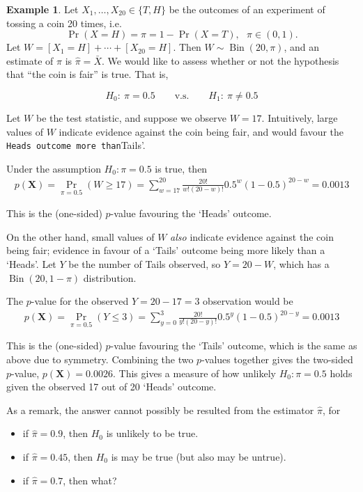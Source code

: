 \documentclass[
]{book}
\providecommand{\tightlist}{%
  \setlength{\itemsep}{0pt}\setlength{\parskip}{0pt}}
\newcommand{\bX}{{\boldsymbol X}}
\DeclareMathOperator{\Bin}{Bin}
\theoremstyle{definition}
\theoremstyle{definition}
\newtheorem{example}{Example}[chapter]
\theoremstyle{definition}
\theoremstyle{definition}
\theoremstyle{remark}
\begin{document}
\begin{example}
\protect\hypertarget{exm:binom}{}\label{exm:binom}Let \(X_1,\dots,X_{20} \in \{T,H\}\) be the outcomes of an experiment of tossing a coin 20 times, i.e.
\[\Pr(X = H) = \pi = 1 - \Pr(X=T), \ \ \ \pi \in (0,1).\]
Let \(W= [X_1=H] + \cdots + [X_{20}=H]\).
Then \(W\sim\Bin(20,\pi)\), and an estimate of \(\pi\) is \(\hat\pi=\bar X\).
We would like to assess whether or not the hypothesis that ``the coin is fair'' is true.
That is,

\[H_0: \ \pi = 0.5 \hspace{2em}\text{v.s.}\hspace{2em} H_1: \ \pi \neq 0.5\]

Let \(W\) be the test statistic, and suppose we observe \(W=17\).
Intuitively, large values of \(W\) indicate evidence against the coin being fair, and would favour the \texttt{Heads\textquotesingle{}\ outcome\ more\ than}Tails'.

Under the assumption \(H_0:\pi=0.5\) is true, then
\begin{align*}
p(\bX) = \Pr_{\pi=0.5} (W \geq 17) = \sum_{w=17}^{20} \frac{20!}{w!(20-w)!} 0.5^w(1-0.5)^{20-w} = 0.0013
\end{align*}

This is the (one-sided) \(p\)-value favouring the `Heads' outcome.

On the other hand, small values of \(W\) \emph{also} indicate evidence against the coin being fair; evidence in favour of a `Tails' outcome being more likely than a `Heads'.
Let \(Y\) be the number of Tails observed, so \(Y=20-W\), which has a \(\Bin(20,1-\pi)\) distribution.

The \(p\)-value for the observed \(Y=20-17=3\) observation would be
\begin{align*}
p(\bX) = \Pr_{\pi=0.5} (Y \leq 3) = \sum_{y=0}^{3} \frac{20!}{y!(20-y)!} 0.5^y(1-0.5)^{20-y} = 0.0013
\end{align*}

This is the (one-sided) \(p\)-value favouring the `Tails' outcome, which is the same as above due to symmetry.
Combining the two \(p\)-values together gives the two-sided \(p\)-value, \(p(\bX)=0.0026\).
This gives a measure of how unlikely \(H_0:\pi=0.5\) holds given the observed 17 out of 20 `Heads' outcome.
\end{example}

As a remark, the answer cannot possibly be resulted from the estimator \(\hat\pi\), for

\begin{itemize}
\tightlist
\item
  if \(\hat\pi=0.9\), then \(H_0\) is unlikely to be true.
\item
  if \(\hat\pi=0.45\), then \(H_0\) is may be true (but also may be untrue).
\item
  if \(\hat\pi=0.7\), then what?
\end{itemize}
\end{document}
